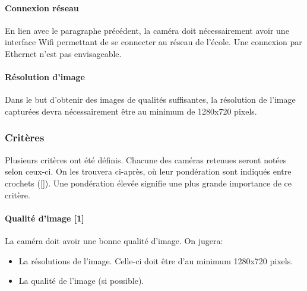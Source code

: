 \paragraph{Connexion réseau}
En lien avec le paragraphe précédent, la caméra doit nécessairement avoir une interface Wifi permettant de se connecter au réseau de l'école. Une connexion par Ethernet n'est pas envisageable.

\paragraph{Résolution d'image}
Dans le but d'obtenir des images de qualités suffisantes, la résolution de l'image capturées devra nécessairement être au minimum de 1280x720 pixels.

\subsubsection{Critères}
Plusieurs critères ont été définis. Chacune des caméras retenues seront notées selon ceux-ci. On les trouvera ci-après, où leur pondération sont indiqués entre crochets ([]). Une pondération élevée signifie une plus grande importance de ce critère.

\paragraph{Qualité d'image [1]}
La caméra doit avoir une bonne qualité d'image. On jugera:
\begin{itemize}
    \item La résolutions de l'image. Celle-ci doit être d'au minimum 1280x720 pixels.
    \item La qualité de l'image (si possible).
\end{itemize}

